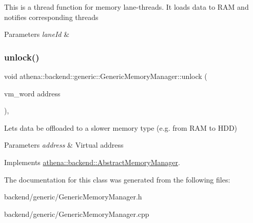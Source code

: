This is a thread function for memory lane-\/threads. It loads data to R\+AM and notifies corresponding threads 
\begin{DoxyParams}{Parameters}
{\em lane\+Id} & \\
\hline
\end{DoxyParams}
\mbox{\label{classathena_1_1backend_1_1generic_1_1_generic_memory_manager_a58a2b56a07a96c3cabb7b8fd079b3eae}} 
\subsubsection{\texorpdfstring{unlock()}{unlock()}}
{\footnotesize\ttfamily void athena\+::backend\+::generic\+::\+Generic\+Memory\+Manager\+::unlock (\begin{DoxyParamCaption}\item[{vm\+\_\+word}]{address }\end{DoxyParamCaption})\hspace{0.3cm}{\ttfamily [override]}, {\ttfamily [virtual]}}

Lets data be offloaded to a slower memory type (e.\+g. from R\+AM to H\+DD) 
\begin{DoxyParams}{Parameters}
{\em address} & Virtual address \\
\hline
\end{DoxyParams}


Implements \mbox{\hyperlink{classathena_1_1backend_1_1_abstract_memory_manager_aec859ee3bf6011d8710b2ec4bfc2373e}{athena\+::backend\+::\+Abstract\+Memory\+Manager}}.



The documentation for this class was generated from the following files\+:\begin{DoxyCompactItemize}
\item 
backend/generic/Generic\+Memory\+Manager.\+h\item 
backend/generic/Generic\+Memory\+Manager.\+cpp\end{DoxyCompactItemize}
